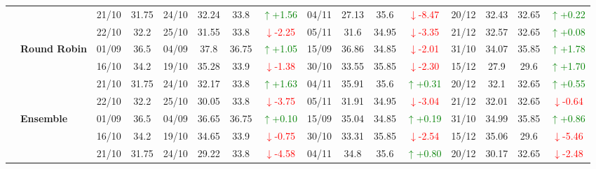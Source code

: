 {\begin{longtable}{llcc|cccc|cccc|cccc}
&
& 21/10 & 31.75 & 24/10 & 32.24 & 33.8 & \textcolor{green}{\(\uparrow\)+1.56} & 04/11 & 27.13 & 35.6 & \textcolor{red}{\(\downarrow\)-8.47} & 20/12 & 32.43 & 32.65 & \textcolor{green}{\(\uparrow\)+0.22} \\

&
& 22/10 & 32.2 & 25/10 & 31.55 & 33.8 & \textcolor{red}{\(\downarrow\)-2.25} & 05/11 & 31.6 & 34.95 & \textcolor{red}{\(\downarrow\)-3.35} & 21/12 & 32.57 & 32.65 & \textcolor{green}{\(\uparrow\)+0.08} \\
\cmidrule(lr){2-16}


& \textbf{Round Robin}
& 01/09 & 36.5 & 04/09 & 37.8 & 36.75 & \textcolor{green}{\(\uparrow\)+1.05} & 15/09 & 36.86 & 34.85 & \textcolor{red}{\(\downarrow\)-2.01} & 31/10 & 34.07 & 35.85 & \textcolor{green}{\(\uparrow\)+1.78} \\

&
& 16/10 & 34.2 & 19/10 & 35.28 & 33.9 & \textcolor{red}{\(\downarrow\)-1.38} & 30/10 & 33.55 & 35.85 & \textcolor{red}{\(\downarrow\)-2.30} & 15/12 & 27.9 & 29.6 & \textcolor{green}{\(\uparrow\)+1.70} \\

&
& 21/10 & 31.75 & 24/10 & 32.17 & 33.8 & \textcolor{green}{\(\uparrow\)+1.63} & 04/11 & 35.91 & 35.6 & \textcolor{green}{\(\uparrow\)+0.31} & 20/12 & 32.1 & 32.65 & \textcolor{green}{\(\uparrow\)+0.55} \\

&
& 22/10 & 32.2 & 25/10 & 30.05 & 33.8 & \textcolor{red}{\(\downarrow\)-3.75} & 05/11 & 31.91 & 34.95 & \textcolor{red}{\(\downarrow\)-3.04} & 21/12 & 32.01 & 32.65 & \textcolor{red}{\(\downarrow\)-0.64} \\
\cmidrule(lr){2-16}



& \textbf{Ensemble}
& 01/09 & 36.5 & 04/09 & 36.65 & 36.75 & \textcolor{green}{\(\uparrow\)+0.10} & 15/09 & 35.04 & 34.85 & \textcolor{green}{\(\uparrow\)+0.19} & 31/10 & 34.99 & 35.85 & \textcolor{green}{\(\uparrow\)+0.86} \\

&
& 16/10 & 34.2 & 19/10 & 34.65 & 33.9 & \textcolor{red}{\(\downarrow\)-0.75} & 30/10 & 33.31 & 35.85 & \textcolor{red}{\(\downarrow\)-2.54} & 15/12 & 35.06 & 29.6 & \textcolor{red}{\(\downarrow\)-5.46} \\

&
& 21/10 & 31.75 & 24/10 & 29.22 & 33.8 & \textcolor{red}{\(\downarrow\)-4.58} & 04/11 & 34.8 & 35.6 & \textcolor{green}{\(\uparrow\)+0.80} & 20/12 & 30.17 & 32.65 & \textcolor{red}{\(\downarrow\)-2.48} \\


\end{longtable}}
